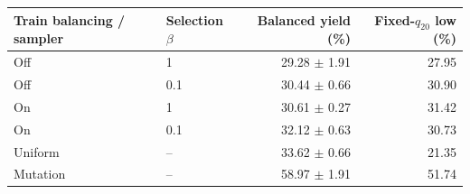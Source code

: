\begin{center}\small
\begin{tabular}{llrr}
\toprule
Train balancing / sampler & Selection $\beta$ & Balanced yield (\%) & Fixed-$q_{20}$ low (\%)\\
\midrule
Off & 1 & 29.28 $\pm$ 1.91 & 27.95\\
Off & 0.1 & 30.44 $\pm$ 0.66 & 30.90\\
On & 1 & 30.61 $\pm$ 0.27 & 31.42\\
On & 0.1 & 32.12 $\pm$ 0.63 & 30.73\\
Uniform & -- & 33.62 $\pm$ 0.66 & 21.35\\
Mutation & -- & 58.97 $\pm$ 1.91 & 51.74\\
\bottomrule
\end{tabular}
\end{center}
